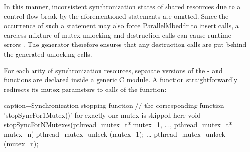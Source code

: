 In this manner, inconsistent synchronization states of shared resources due to a control flow break by the aforementioned statements are omitted. Since the occurrence of such a statement may also force ParallelMbeddr to insert  calls, a careless mixture of mutex unlocking and destruction calls can cause runtime errors \cite{Mutexes}. The generator therefore ensures that any destruction calls are put behind the generated unlocking calls.

For each arity of synchronization resources, separate versions of the - and  functions are declared inside a generic C module. A  function straightforwardly redirects its mutex parameters to calls of the  function:
\begin{ccode}{caption=Synchronization stopping function}
// the corresponding function 'stopSyncFor1Mutex()' for exactly one mutex is skipped here
void stopSyncForNMutexes(pthread_mutex_t* mutex_1, ..., pthread_mutex_t* mutex_n) { 
  pthread_mutex_unlock (mutex_1);
  ...
  pthread_mutex_unlock (mutex_n); 
}
\end{ccode}


